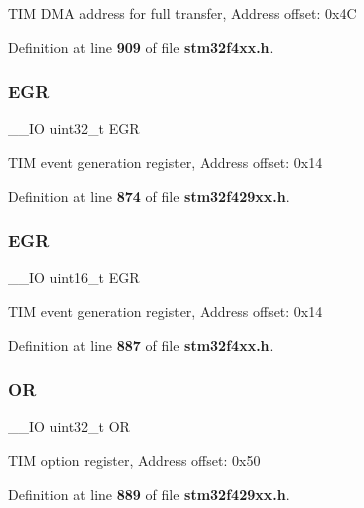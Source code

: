 T\+IM D\+MA address for full transfer, Address offset\+: 0x4C 

Definition at line \textbf{ 909} of file \textbf{ stm32f4xx.\+h}.

\mbox{\label{structTIM__TypeDef_a196ebdaac12b21e90320c6175da78ef6}} 
\subsubsection{E\+GR\hspace{0.1cm}{\footnotesize\ttfamily [1/2]}}
{\footnotesize\ttfamily \+\_\+\+\_\+\+IO uint32\+\_\+t E\+GR}

T\+IM event generation register, Address offset\+: 0x14 

Definition at line \textbf{ 874} of file \textbf{ stm32f429xx.\+h}.

\mbox{\label{structTIM__TypeDef_a980df1a5752e36604de4d71ce14fbfa3}} 
\subsubsection{E\+GR\hspace{0.1cm}{\footnotesize\ttfamily [2/2]}}
{\footnotesize\ttfamily \+\_\+\+\_\+\+IO uint16\+\_\+t E\+GR}

T\+IM event generation register, Address offset\+: 0x14 

Definition at line \textbf{ 887} of file \textbf{ stm32f4xx.\+h}.

\mbox{\label{structTIM__TypeDef_a75ade4a9b3d40781fd80ce3e6589e98b}} 
\subsubsection{OR\hspace{0.1cm}{\footnotesize\ttfamily [1/2]}}
{\footnotesize\ttfamily \+\_\+\+\_\+\+IO uint32\+\_\+t OR}

T\+IM option register, Address offset\+: 0x50 

Definition at line \textbf{ 889} of file \textbf{ stm32f429xx.\+h}.

\mbox{\label{structTIM__TypeDef_a47766f433b160258ec05dbb6498fd271}} 
